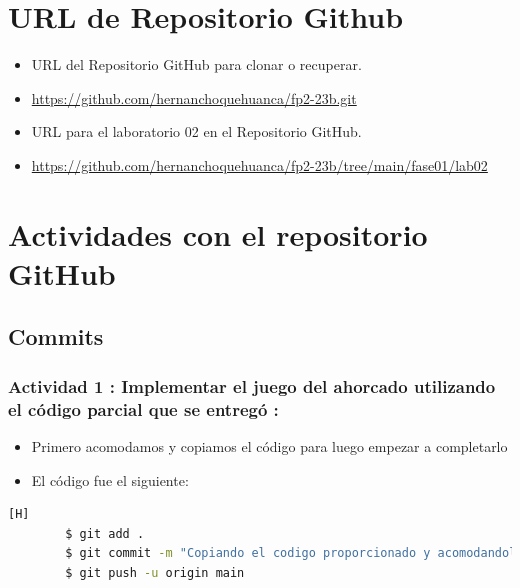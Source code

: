 \documentclass{article}
\begin{document}
	\section{URL de Repositorio Github}
	\begin{itemize}
		\item URL del Repositorio GitHub para clonar o recuperar.
        \item \url{https://github.com/hernanchoquehuanca/fp2-23b.git}
		\item URL para el laboratorio 02 en el Repositorio GitHub.
		\item \url{https://github.com/hernanchoquehuanca/fp2-23b/tree/main/fase01/lab02}
	\end{itemize}
	
	\section{Actividades con el repositorio GitHub}
        
        

    \subsection{Commits}
    \subsubsection{Actividad 1 : Implementar el juego del ahorcado utilizando el código parcial que se entregó :}
    \begin{itemize}	
        \item Primero acomodamos y copiamos el código para luego empezar a completarlo
	\item El código fue el siguiente:
    \end{itemize}
    
    
    \begin{lstlisting}[language=bash,caption={Commit: Copiando el código proporcionado y acomodandolo}][H]
		$ git add .
		$ git commit -m "Copiando el codigo proporcionado y acomodandolo"			
		$ git push -u origin main
	\end{lstlisting}
\end{document}
